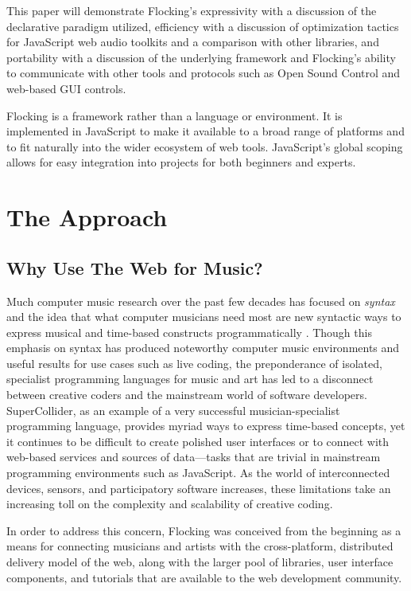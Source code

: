 \documentclass{article}
\begin{document}
This paper will demonstrate Flocking's expressivity with a discussion of the declarative paradigm utilized, efficiency with a discussion of optimization tactics for JavaScript web audio toolkits and a comparison with other libraries, and portability with a discussion of the underlying framework and Flocking's ability to communicate with other tools and protocols such as Open Sound Control and web-based GUI controls.

Flocking is a framework rather than a language or environment. It is implemented in JavaScript to make it available to a broad range of platforms and to fit naturally into the wider ecosystem of web tools. JavaScript's global scoping allows for easy integration into projects for both beginners and experts.

\section{The Approach}

\subsection{Why Use The Web for Music?}

Much computer music research over the past few decades has focused on {\it syntax} and the idea that what computer musicians need most are new syntactic ways to express musical and time-based constructs programmatically \cite{dannenberg2002language,wang2003chuck,mccartney1996supercollider,Puckette96puredata}. Though this emphasis on syntax has produced noteworthy computer music environments and useful results for use cases such as live coding, the preponderance of isolated, specialist programming languages for music and art has led to a disconnect between creative coders and the mainstream world of software developers. SuperCollider, as an example of a very successful musician-specialist programming language, provides myriad ways to express time-based concepts, yet it continues to be difficult to create polished user interfaces or to connect with web-based services and sources of data---tasks that are trivial in mainstream programming environments such as JavaScript. As the world of interconnected devices, sensors, and participatory software increases, these limitations take an increasing toll on the complexity and scalability of creative coding.

In order to address this concern, Flocking was conceived from the beginning as a means for connecting musicians and artists with the cross-platform, distributed delivery model of the web, along with the larger pool of libraries, user interface components, and tutorials that are available to the web development community.
\end{document}
